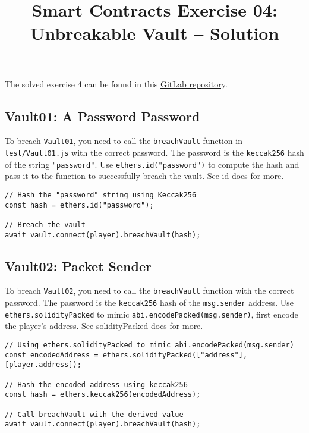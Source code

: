 \documentclass[12pt]{article}
\title{Smart Contracts Exercise 04: \\ Unbreakable Vault -- Solution}
\author{}
\date{}
\begin{document}
\maketitle

\noindent
The solved exercise 4 can be found in this \href{https://gitlab.fel.cvut.cz/radovluk/smart-contracts-exercises/-/tree/main/04-Unbreakable-Vault/solution/solution-code?ref_type=heads}{GitLab repository}.

\subsection*{Vault01: A Password Password}

To breach \texttt{Vault01}, you need to call the \texttt{breachVault} function in \texttt{test/Vault01.js} with the correct password. The password is the \texttt{keccak256} hash of the string \texttt{"password"}. Use \texttt{ethers.id("password")} to compute the hash and pass it to the function to successfully breach the vault. See \href{https://docs.ethers.org/v6/api/hashing/\#id}{id docs} for more.

\noindent
\begin{minipage}{\textwidth}
\begin{verbatim}
// Hash the "password" string using Keccak256
const hash = ethers.id("password");

// Breach the vault
await vault.connect(player).breachVault(hash);
\end{verbatim}
\end{minipage}

\subsection*{Vault02: Packet Sender}

To breach \texttt{Vault02}, you need to call the \texttt{breachVault} function with the correct password. The password is the \texttt{keccak256} hash of the \texttt{msg.sender} address. Use \texttt{ethers.solidityPacked} to mimic \texttt{abi.encodePacked(msg.sender)}, first encode the player's address. See \href{https://docs.ethers.org/v6/api/hashing/\#solidityPacked}{solidityPacked docs} for more.

\noindent
\begin{minipage}{\textwidth}
\begin{verbatim}
// Using ethers.solidityPacked to mimic abi.encodePacked(msg.sender)
const encodedAddress = ethers.solidityPacked(["address"], [player.address]);

// Hash the encoded address using keccak256
const hash = ethers.keccak256(encodedAddress);

// Call breachVault with the derived value
await vault.connect(player).breachVault(hash);
\end{verbatim}
\end{minipage}
\end{document}

